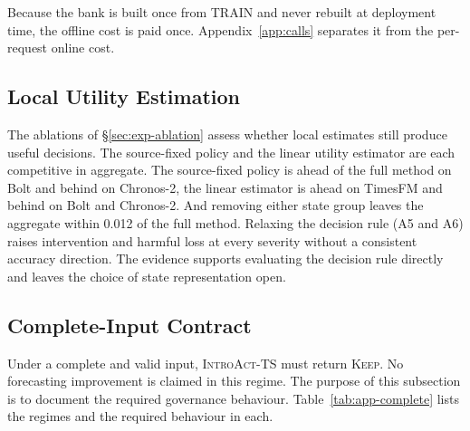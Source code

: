 \documentclass{article}
\newcommand{\introact}{\textsc{IntroAct-TS}}
\begin{document}
Because the bank is built once from TRAIN and never rebuilt at deployment time, the offline
cost is paid once. Appendix~\ref{app:calls} separates it from the per-request online cost.

\subsection{Local Utility Estimation}
\label{app:transfer}
The ablations of \S\ref{sec:exp-ablation} assess whether local estimates still produce
useful decisions. The source-fixed policy and the linear utility estimator are each
competitive in aggregate. The source-fixed policy is ahead of the full method on Bolt and
behind on Chronos-2, the linear estimator is ahead on TimesFM and behind on Bolt and
Chronos-2. And removing either state group leaves the aggregate within 0.012 of the full
method. Relaxing the decision rule (A5 and A6) raises intervention and harmful loss at
every severity without a consistent accuracy direction. The evidence supports evaluating
the decision rule directly and leaves the choice of state representation open.

\subsection{Complete-Input Contract}
\label{app:contract}
Under a complete and valid input, \introact{} must return \textsc{Keep}. No forecasting
improvement is claimed in this regime. The purpose of this subsection is to document the
required governance behaviour. Table~\ref{tab:app-complete} lists the
regimes and the required behaviour in each.

\begin{table}[htbp]
  \caption{Governance contract by input regime. The complete-input rows are contract
  statements and not accuracy results. The expected behaviour there is a no-op, and a non-no-op
  would violate the input-preservation requirement.}
  \label{tab:app-complete}
  \centering
  \small
  \setlength{\tabcolsep}{4pt}
\end{table}
\end{document}
